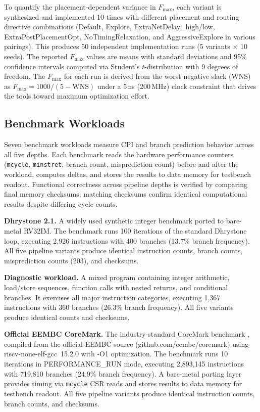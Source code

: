 \documentclass[journal]{IEEEtran}
\begin{document}
\begin{table}[t]
\begin{table}[t]
To quantify the placement-dependent variance in $F_{\max}$, each variant is synthesized and implemented 10 times with different placement and routing directive combinations (Default, Explore, ExtraNetDelay\_high/low, ExtraPostPlacementOpt, NoTimingRelaxation, and AggressiveExplore in various pairings). This produces 50 independent implementation runs (5 variants $\times$ 10 seeds). The reported $F_{\max}$ values are means with standard deviations and 95\% confidence intervals computed via Student's $t$-distribution with 9 degrees of freedom. The $F_{\max}$ for each run is derived from the worst negative slack (WNS) as $F_{\max} = 1000/(5 - \text{WNS})$ under a 5\,ns (200\,MHz) clock constraint that drives the tools toward maximum optimization effort.

\subsection{Benchmark Workloads}

Seven benchmark workloads measure CPI and branch prediction behavior across all five depths. Each benchmark reads the hardware performance counters (\texttt{mcycle}, \texttt{minstret}, branch count, misprediction count) before and after the workload, computes deltas, and stores the results to data memory for testbench readout. Functional correctness across pipeline depths is verified by comparing final memory checksums: matching checksums confirm identical computational results despite differing cycle counts.

\textbf{Dhrystone 2.1.} A widely used synthetic integer benchmark \cite{hennessy2017computer} ported to bare-metal RV32IM. The benchmark runs 100 iterations of the standard Dhrystone loop, executing 2{,}926 instructions with 400 branches (13.7\% branch frequency). All five pipeline variants produce identical instruction counts, branch counts, misprediction counts (203), and checksums.

\textbf{Diagnostic workload.} A mixed program containing integer arithmetic, load/store sequences, function calls with nested returns, and conditional branches. It exercises all major instruction categories, executing 1{,}367 instructions with 360 branches (26.3\% branch frequency). All five variants produce identical counts and checksums.

\textbf{Official EEMBC CoreMark.} The industry-standard CoreMark benchmark \cite{coremark}, compiled from the official EEMBC source (github.com/eembc/coremark) using riscv-none-elf-gcc~15.2.0 with -O1 optimization. The benchmark runs 10 iterations in PERFORMANCE\_RUN mode, executing 2{,}893{,}145 instructions with 719{,}810 branches (24.9\% branch frequency). A bare-metal porting layer provides timing via \texttt{mcycle} CSR reads and stores results to data memory for testbench readout. All five pipeline variants produce identical instruction counts, branch counts, and checksums.


\end{table}
\end{table}
\end{document}
